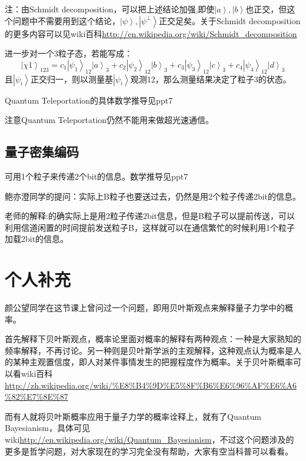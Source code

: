 \documentclass[10pt,a4paper,nocap]{ctexart}
\newcommand{\ket}[1]{\left|#1\right>}
\begin{document}
注：由Schmidt decomposition，可以把上述结论加强,即使\(\ket{a},\ket{b}\)也正交，但这个问题中不需要用到这个结论，\(\ket{\psi} ,\ket{\psi^\perp}\)正交足矣。关于Schmidt decomposition的更多内容可以见wiki百科\url{http://en.wikipedia.org/wiki/Schmidt_decomposition}

进一步对一个3粒子态，若能写成：\[\ket{\chi1}_{123} = c_1\ket{\psi_1}_{12}\ket{a}_3 + c_2\ket{\psi_2}_{12}\ket{b}_3 + c_3\ket{\psi_3}_{12}\ket{c}_3 + c_4\ket{\psi_4}_{12}\ket{d}_3\]
且\(\ket{\psi_i}\)正交归一，则以测量基\(\ket{\psi_i}\)观测12，那么测量结果决定了粒子3的状态。

Quantum Teleportation的具体数学推导见ppt7

注意Quantum Teleportation仍然不能用来做超光速通信。
\subsection{量子密集编码}
可用1个粒子来传递2个bit的信息。数学推导见ppt7

鲍亦澄同学的提问：实际上B粒子也要送过去，仍然是用2个粒子传递2bit的信息。

老师的解释:的确实际上是用2粒子传递2bit信息，但是B粒子可以提前传送，可以利用信道闲置的时间提前发送粒子B，这样就可以在通信繁忙的时候利用1个粒子加载2bit的信息。
\section{个人补充}
 颜公望同学在这节课上曾问过一个问题，即用贝叶斯观点来解释量子力学中的概率。
 
 首先解释下贝叶斯观点，概率论里面对概率的解释有两种观点：一种是大家熟知的频率解释，不再讨论。另一种则是贝叶斯学派的主观解释，这种观点认为概率是人的某种主观置信度，即人对某件事情发生的把握程度作为概率。关于贝叶斯概率可以看wiki百科\url{http://zh.wikipedia.org/wiki/%E8%B4%9D%E5%8F%B6%E6%96%AF%E6%A6%82%E7%8E%87}
 
 而有人就将贝叶斯概率应用于量子力学的概率诠释上，就有了Quantum Bayesianism，具体可见wiki\url{http://en.wikipedia.org/wiki/Quantum_Bayesianism}，不过这个问题涉及的更多是哲学问题，对大家现在的学习完全没有帮助，大家有空当科普可以看看。 
\end{document}
